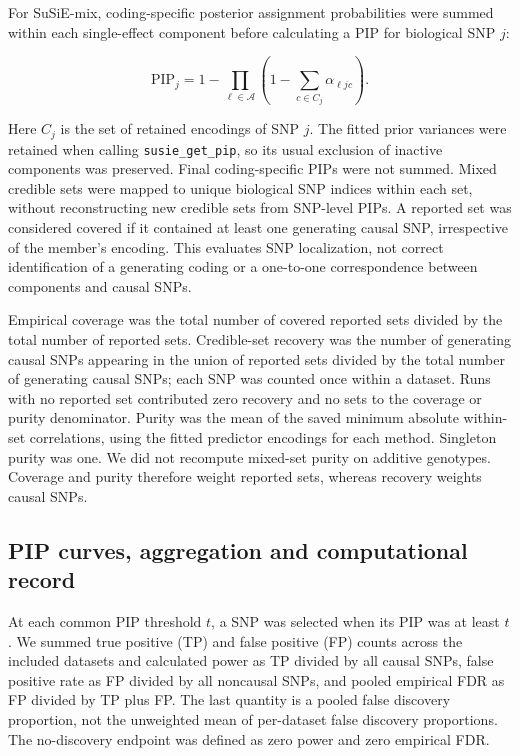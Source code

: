 \documentclass[12pt]{article}
\begin{document}
For SuSiE-mix, coding-specific posterior assignment probabilities were
summed within each single-effect component before calculating a PIP
for biological SNP $j$:

\begin{equation}
\mathrm{PIP}_j=1-\prod_{\ell\in\mathcal{A}}
 \left(1-\sum_{c\in C_j}\alpha_{\ell jc}\right).
\end{equation}

Here $C_j$ is the set of retained encodings of SNP $j$. The fitted
prior variances were retained when calling \texttt{susie\_get\_pip},
so its usual exclusion of inactive components was preserved. Final
coding-specific PIPs were not summed. Mixed credible sets were mapped
to unique biological SNP indices within each set, without reconstructing
new credible sets from SNP-level PIPs. A reported set was considered
covered if it contained at least one generating causal SNP, irrespective
of the member's encoding. This evaluates SNP localization, not correct
identification of a generating coding or a one-to-one correspondence
between components and causal SNPs.

Empirical coverage was the total number of covered reported sets divided
by the total number of reported sets. Credible-set recovery was the
number of generating causal SNPs appearing in the union of reported
sets divided by the total number of generating causal SNPs; each SNP
was counted once within a dataset. Runs with no reported set contributed
zero recovery and no sets to the coverage or purity denominator. Purity
was the mean of the saved minimum absolute within-set correlations,
using the fitted predictor encodings for each method. Singleton purity
was one. We did not recompute mixed-set purity on additive genotypes.
Coverage and purity therefore weight reported sets, whereas recovery
weights causal SNPs.

\subsection{PIP curves, aggregation and computational record}

At each common PIP threshold $t$, a SNP was selected when its PIP was
at least $t$. We summed true positive (TP) and false positive (FP)
counts across the included datasets and calculated power as TP divided
by all causal SNPs, false positive rate as FP divided by all noncausal
SNPs, and pooled empirical FDR as FP divided by TP plus FP. The last
quantity is a pooled false discovery proportion, not the unweighted
mean of per-dataset false discovery proportions. The no-discovery
endpoint was defined as zero power and zero empirical FDR.
\end{document}
